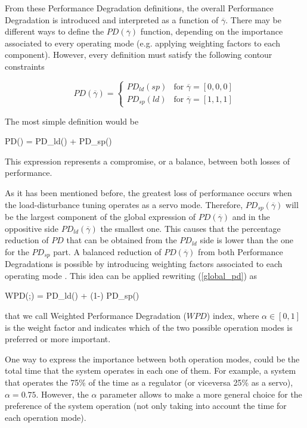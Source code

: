 From these Performance Degradation definitions, the overall
Performance Degradation is introduced and interpreted as a
function of $\overline{\gamma}$. There may be different ways to
define the $PD(\overline{\gamma})$ function, depending on the
importance associated to every operating mode (e.g. applying
weighting factors to each component). However, every definition
must satisfy the following contour constraints

\begin{displaymath}
PD(\overline{\gamma}) = \left \{ \begin{array}{ll} PD_{ld}(sp) &
\textrm{for  $\overline{\gamma}=\left[0,
0, 0 \right]$}\\
PD_{sp}(ld) & \textrm{for  $\overline{\gamma}=\left[1, 1, 1
\right]$}
\end{array} \right.
\end{displaymath}

The most simple definition would be

\be PD(\overline{\gamma}) =
PD_{ld}(\overline{\gamma}) + PD_{sp}(\overline{\gamma})
\label{global_pd} \ee

This expression represents a compromise, or a balance, between
both losses of performance.

As it has been mentioned before, the greatest loss of performance
occurs when the load-disturbance tuning operates as a servo mode.
Therefore, $PD_{sp}(\overline{\gamma})$ will be the largest
component of the global expression of $PD(\overline{\gamma})$ and
in the oppositive side $PD_{ld}(\overline{\gamma})$ the smallest
one. This causes that the percentage reduction of $\mathit{PD}$
that can be obtained from the $PD_{ld}$ side is lower than the one
for the $PD_{sp}$ part. A balanced reduction of
$PD(\overline{\gamma})$ from both Performance Degradations is
possible by introducing weighting factors associated to each
operating mode \cite{arrietaCSC2007}. This idea can be applied
rewriting (\ref{global_pd}) as

\be WPD(\overline{\gamma};\alpha) = \alpha
PD_{ld}(\overline{\gamma}) + (1-\alpha) PD_{sp}(\overline{\gamma})
\label{alpha_pd} \ee

\noindent that we call Weighted Performance Degradation
($\mathit{WPD}$) index, where $\alpha \in [0,1]$ is the weight
factor and indicates which of the two possible operation modes is
preferred or more important.

One way to express the importance between both operation modes,
could be the total time that the system operates in each one of
them. For example, a system that operates the 75\% of the time as
a regulator (or viceversa 25\% as a servo), $\alpha=0.75$.
However, the $\alpha$ parameter allows to make a more general
choice for the preference of the system operation (not only taking
into account the time for each operation mode).


